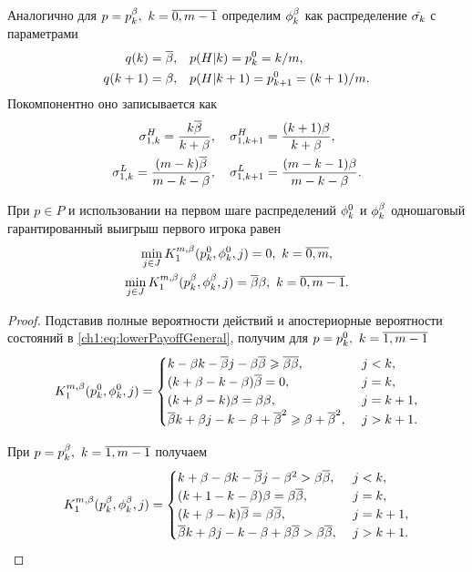 {Аналогично для $p = \pOdd,\ k = \overline{0, m-1}$ определим $\fOdd$ как распределение $\sigmak$ с параметрами
\begin{align*}
  \qc{k} = \DCo,& \quad \pac{H}{k} = \pEven[k] = k/m,\\
  \qc{k+1} = \Co,& \quad \pac{H}{k+1} = \pEven[k+1] = (k+1)/m.
\end{align*}
Покомпонентно оно записывается как
\begin{gather*}
  \sigmasc[H]{k} = \frac{k\DCo}{k + \Co},\quad 
  \sigmasc[H]{k+1} = \frac{(k+1)\Co}{k + \Co},\\
  \sigmasc[L]{k} = \frac{(m - k)\DCo}{m - k - \Co},\quad 
  \sigmasc[L]{k+1} = \frac{(m - k - 1)\Co}{m - k - \Co}.
\end{gather*}

\begin{proposition}
  \label{ch1:prop:K1-base}
  При $p \in P$ и использовании на первом шаге распределений $\fEven$ и $\fOdd$ одношаговый гарантированный выигрыш первого игрока равен
  \begin{equation}
    \label{ch1:eq:lowerBound:inequalities}
    \begin{gathered}
      \min_{j \in J}
      \K*{1}(\pEven, \fEven, j) = 0,\ k = \overline{0, m}, \\
      \min_{j \in J}
      \K*{1}(\pOdd, \fOdd, j) = \DCo\Co,\ k = \overline{0, m-1}.
    \end{gathered}
  \end{equation}
\end{proposition}
\begin{proof}
  Подставив полные вероятности действий и апостериорные вероятности состояний в \eqref{ch1:eq:lowerPayoffGeneral}, получим для $p = \pEven,\ k = \overline{1, m-1}$
  \begin{equation*}
    \K*{1}(\pEven, \fEven, j) = \begin{cases}
      k - \Co k - \DCo j - \Co \DCo \geq \DCo \DCo,\ & j < k,\\
      (k + \Co - k - \Co) \DCo = 0,\ & j = k,\\
      (k + \Co - k) \Co = \Co \Co,\ & j = k+1,\\
      \DCo k + \Co j - k - \Co + \DCo^2 \geq \Co + \DCo^2,\ & j > k+1.
    \end{cases}
  \end{equation*}

  При $p = \pOdd[k],\ k = \overline{1,m-1}$ получаем
  \begin{equation*}
    \K*{1}(\pOdd, \fOdd, j) = \begin{cases}
      k + \Co - \Co k - \DCo j - \Co^2 > \Co \DCo,\ & j < k,\\
      (k + 1 - k - \Co) \Co = \Co \DCo,\ & j = k,\\
      (k + \Co - k) \DCo = \Co \DCo,\ & j = k+1,\\
      \DCo k + \Co j - k - \Co + \Co \DCo > \Co \DCo,\ & j > k+1.
    \end{cases}
  \end{equation*}
  


\end{proof}}
